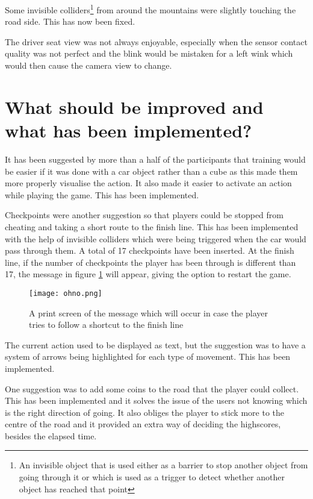 Some invisible colliders\footnote{An invisible object that is used either as a barrier to stop another object from going through it or which is used as a trigger to detect whether another object has reached that point} from around the mountains were slightly touching the road side. This has now been fixed.

The driver seat view was not always enjoyable, especially when the sensor contact quality was not perfect and the blink would be mistaken for a left wink which would then cause the camera view to change.

\section{What should be improved and what has been implemented?}
\label{section:implemented}
It has been suggested by more than a half of the participants that training would be easier if it was done with a car object rather than a cube as this made them more properly visualise the action. It also made it easier to activate an action while playing the game. This has been implemented.

Checkpoints were another suggestion so that players could be stopped from cheating and taking a short route to the finish line. This has been implemented with the help of invisible colliders which were being triggered when the car would pass through them. A total of 17 checkpoints have been inserted. At the finish line, if the number of checkpoints the player has been through is different than 17, the message in figure \ref{fig:ohno} will appear, giving the option to restart the game.

\begin{figure}
  \centering
  \texttt{[image: ohno.png]}
  \caption{A print screen of the message which will occur in case the player tries to follow a shortcut to the finish line}
    \label{fig:ohno}        
\end{figure}

The current action used to be displayed as text, but the suggestion was to have a system of arrows being highlighted for each type of movement. This has been implemented.

One suggestion was to add some coins to the road that the player could collect. This has been implemented and it solves the issue of the users not knowing which is the right direction of going. It also obliges the player to stick more to the centre of the road and it provided an extra way of deciding the highscores, besides the elapsed time.  

